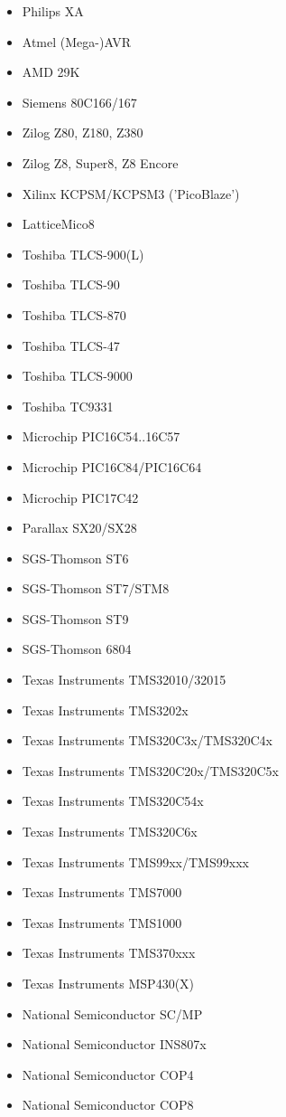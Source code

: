 \documentclass[12pt,a4paper,twoside]{report}
\begin{document}
\begin{itemize}
\item{Philips XA}
\item{Atmel (Mega-)AVR}
\item{AMD 29K}
\item{Siemens 80C166/167}
\item{Zilog Z80, Z180, Z380}
\item{Zilog Z8, Super8, Z8 Encore}
\item{Xilinx KCPSM/KCPSM3 ('PicoBlaze')}
\item{LatticeMico8}
\item{Toshiba TLCS-900(L)}
\item{Toshiba TLCS-90}
\item{Toshiba TLCS-870}
\item{Toshiba TLCS-47}
\item{Toshiba TLCS-9000}
\item{Toshiba TC9331}
\item{Microchip PIC16C54..16C57}
\item{Microchip PIC16C84/PIC16C64}
\item{Microchip PIC17C42}
\item{Parallax SX20/SX28}
\item{SGS-Thomson ST6}
\item{SGS-Thomson ST7/STM8}
\item{SGS-Thomson ST9}
\item{SGS-Thomson 6804}
\item{Texas Instruments TMS32010/32015}
\item{Texas Instruments TMS3202x}
\item{Texas Instruments TMS320C3x/TMS320C4x}
\item{Texas Instruments TMS320C20x/TMS320C5x}
\item{Texas Instruments TMS320C54x}
\item{Texas Instruments TMS320C6x}
\item{Texas Instruments TMS99xx/TMS99xxx}
\item{Texas Instruments TMS7000}
\item{Texas Instruments TMS1000}
\item{Texas Instruments TMS370xxx}
\item{Texas Instruments MSP430(X)}
\item{National Semiconductor SC/MP}
\item{National Semiconductor INS807x}
\item{National Semiconductor COP4}
\item{National Semiconductor COP8}

\end{itemize}
\end{document}
